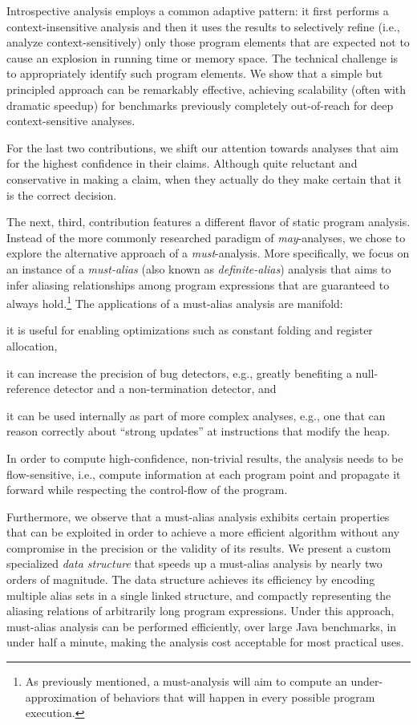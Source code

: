 Introspective analysis employs a common adaptive pattern: it first performs a context-insensitive analysis and then it uses the results to selectively refine (i.e., analyze context-sensitively) only those program elements that are expected not to cause an explosion in running time or memory space. The technical challenge is to appropriately identify such program elements. We show that a simple but principled approach can be remarkably effective, achieving scalability (often with dramatic speedup) for benchmarks previously completely out-of-reach for deep context-sensitive analyses.

For the last two contributions, we shift our attention towards analyses that aim for the highest confidence in their claims. Although quite reluctant and conservative in making a claim, when they actually do they make certain that it is the correct decision.

 The next, third, contribution features a different flavor of static program analysis. Instead of the more commonly researched paradigm of \emph{may}-analyses, we chose to explore the alternative approach of a \emph{must}-analysis. More specifically, we focus on an instance of a \emph{must-alias} (also known as \emph{definite-alias}) analysis that aims to infer aliasing relationships among program expressions that are guaranteed to always hold.\footnote{As previously mentioned, a must-analysis will aim to compute an under-approximation of behaviors that will happen in every possible program execution.} The applications of a must-alias analysis are manifold:
\begin{inparaenum}[(1)]
\item it is useful for enabling optimizations such as constant folding and register allocation,
\item it can increase the precision of bug detectors, e.g., greatly benefiting a null-reference detector and a non-termination detector, and
\item it can be used internally as part of more complex analyses, e.g., one that can reason correctly about ``strong updates'' at instructions that modify the heap.
\end{inparaenum}
In order to compute high-confidence, non-trivial results, the analysis needs to be flow-sensitive, i.e., compute information at each program point and propagate it forward while respecting the control-flow of the program.

Furthermore, we observe that a must-alias analysis exhibits certain properties that can be exploited in order to achieve a more efficient algorithm without any compromise in the precision or the validity of its results. We present a custom specialized \emph{data structure} that speeds up a must-alias analysis by nearly two orders of magnitude. The data structure achieves its efficiency by encoding multiple alias sets in a single linked structure, and compactly representing the aliasing relations of arbitrarily long program expressions. Under this approach, must-alias analysis can be performed efficiently, over large Java benchmarks, in under half a minute, making the analysis cost acceptable for most practical uses.

